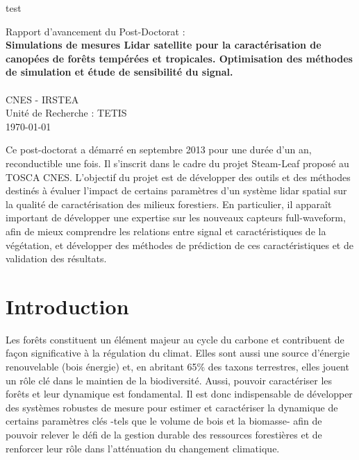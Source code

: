 \documentclass[a4paper,11pt]{article}
\begin{document}
\LARGE test
\begin{center}
 \Large Rapport d'avancement du Post-Doctorat :\\[1cm]
 \LARGE \textbf{Simulations de mesures Lidar satellite pour la caractérisation de canopées de forêts tempérées et tropicales. Optimisation des méthodes de simulation et étude de sensibilité du signal.}\\[1cm]
 
 \\[1cm]
 CNES - IRSTEA \\[1cm]
 
\large Unité  de Recherche  : TETIS\\[0.5cm]
 \today
\end{center}

\vspace{1.5cm}

\renewcommand{\contentsname}{}
\tableofcontents

\clearpage


Ce post-doctorat a démarré en septembre 2013 pour une durée d'un an, reconductible une fois. Il s'inscrit dans le cadre du projet Steam-Leaf proposé au TOSCA CNES. L'objectif du projet est de  développer des outils et des méthodes destinés à évaluer l'impact de certains paramètres d'un système lidar spatial sur la qualité de caractérisation des milieux forestiers. En particulier, il apparaît important de développer une expertise sur les nouveaux capteurs full-waveform, afin de mieux comprendre les relations entre signal et caractéristiques de la végétation, et développer des méthodes de prédiction de ces caractéristiques et de validation des résultats.


\section{Introduction}
Les forêts  constituent un élément majeur au cycle du carbone et contribuent de façon significative à la régulation du climat. Elles sont aussi une source d'énergie renouvelable (bois énergie) et, en abritant 65\% des taxons terrestres, elles jouent  un rôle clé dans le maintien de la biodiversité. Aussi, pouvoir caractériser les forêts et leur dynamique est fondamental. Il est donc indispensable de développer des systèmes robustes de mesure pour estimer et caractériser la dynamique de certains paramètres clés -tels que le volume de bois et la biomasse- afin de pouvoir relever le défi de la gestion durable des ressources forestières et de renforcer leur rôle dans l'atténuation du changement climatique.
\end{document}
